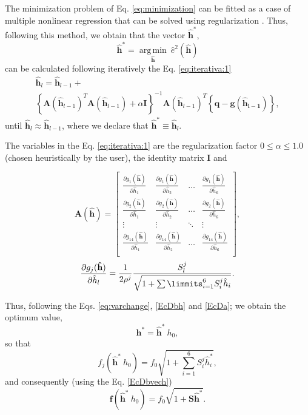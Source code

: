 \documentclass[11pt,twocolumn]{article}
\newcommand{\DERPAR}[4]{\frac{\partial #1_{#3}(\mathbf{\hat{#2}})}{ \partial \hat{#2}_{#4}}}
\begin{document}
The minimization problem of Eq. \ref{eq:minimization} can be fitted as a case of multiple nonlinear regression 
that can be solved using regularization 
\cite[pp. 129]{pujaicoriverafernando2020}. 
Thus, following this method, we obtain that the vector $\mathbf{\hat{h}}^{*}$, 
\begin{equation}
\mathbf{\hat{h}}^{*}= \underset{\mathbf{\hat{h}}}{\operatorname {arg\,min}}~\hat{e}^2(\mathbf{\hat{h}})
\end{equation}
can be calculated following iteratively the Eq. \ref{eq:iterativa:1} 
\small
\begin{equation}\label{eq:iterativa:1}
\begin{array}{l}
\mathbf{\hat{h}}_{l} = \mathbf{\hat{h}}_{l-1}+\\ 
\left\{\mathbf{A}(\mathbf{\hat{h}}_{l-1})^{T} \mathbf{A}(\mathbf{\hat{h}}_{l-1})+\alpha \mathbf{I}\right\}^{-1}
\mathbf{A}(\mathbf{\hat{h}}_{l-1})^{T} \left\{\mathbf{q}-\mathbf{g}(\mathbf{\hat{h}_{l-1}})\right\},
\end{array}
\end{equation}
\normalsize
until $\mathbf{\hat{h}}_{l} \approx \mathbf{\hat{h}}_{l-1}$,
where we declare that $\mathbf{\hat{h}}^{*} \equiv \mathbf{\hat{h}}_{l}$. 

The variables in the Eq. \ref{eq:iterativa:1} are the regularization factor $0 \leq \alpha \leq 1.0$ 
(chosen heuristically  by the user), the identity matrix $\mathbf{I}$ and

\begin{equation}
\mathbf{A}(\mathbf{\hat{h}})=
\left[
\begin{matrix}
\DERPAR{g}{h}{1}{1} & \DERPAR{g}{h}{1}{2} & \hdots & \DERPAR{g}{h}{1}{6} \\ 
\DERPAR{g}{h}{2}{1} & \DERPAR{g}{h}{2}{2} & \hdots & \DERPAR{g}{h}{2}{6} \\
\vdots & \vdots & \ddots & \vdots \\ 
\DERPAR{g}{h}{14}{1} & \DERPAR{g}{h}{14}{2} & \hdots & \DERPAR{g}{h}{14}{6} \\
\end{matrix}
\right],
\end{equation}
\begin{equation}
\DERPAR{g}{h}{j}{l}=
\frac{1}{2 \rho^j}\frac{S_{l}^{j}}{\sqrt{1+\sum\limmits_{i=1}^{6} S_{i}^{j} \hat{h}_i}}.
\end{equation}

Thus, following the Eqs. \ref{eq:varchange}, \ref{EcDbh} and \ref{EcDa}; we obtain the optimum value,
\begin{equation} \label{eq:optimalh}
\mathbf{h}^* = \mathbf{\hat{h}^*}~h_0,
\end{equation}
so that
\begin{equation} \label{EcDbhath}
f_j(\mathbf{\hat{h}^*}~h_0) = f_0 \sqrt{1 +\sum_{i=1}^{6}{S^{j}_{i} \hat{h}^*_i}},
\end{equation}
and consequently (using the Eq. \ref{EcDbvech})
\begin{equation} \label{EcDbhathvec}
\mathbf{f}(\mathbf{\hat{h}^*}~h_0)= f_0 \sqrt{1 +\mathbf{S} \mathbf{\hat{h}^*}}.
\end{equation}
\end{document}
